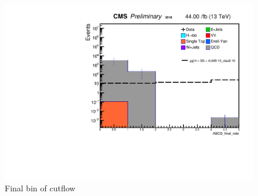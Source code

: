  \begin{figure}[h!]
   \label{fig:Finalbin}
   \centering
   \includegraphics[width=0.67\linewidth]{figs/log_Oct6CutflAnalysisNote_MS-15_ctauS-10_ABCD_final_rate.pdf}
   \caption{Final bin of cutflow}
 \end{figure}



